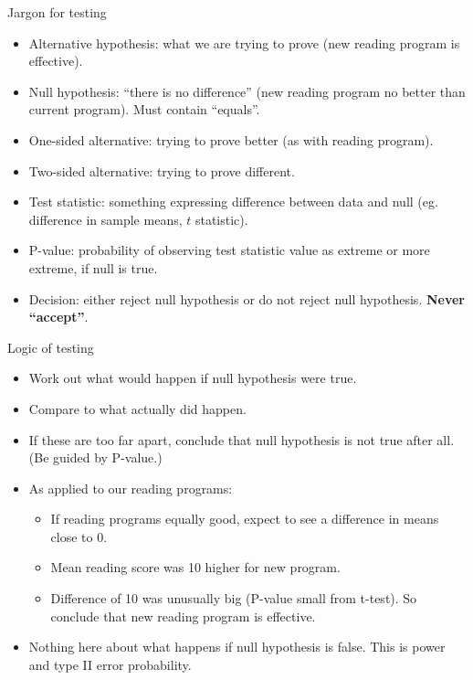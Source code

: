 \documentclass[
  ignorenonframetext,
]{beamer}
\providecommand{\tightlist}{%
  \setlength{\itemsep}{0pt}\setlength{\parskip}{0pt}}
\begin{document}
\begin{frame}{Jargon for testing}
\protect\hypertarget{jargon-for-testing}{}

\begin{itemize}
\tightlist
\item
  Alternative hypothesis: what we are trying to prove (new reading
  program is effective).
\item
  Null hypothesis: ``there is no difference'' (new reading program no
  better than current program). Must contain ``equals''.
\item
  One-sided alternative: trying to prove better (as with reading
  program).
\item
  Two-sided alternative: trying to prove different.
\item
  Test statistic: something expressing difference between data and null
  (eg. difference in sample means, \(t\) statistic).
\item
  P-value: probability of observing test statistic value as extreme or
  more extreme, if null is true.
\item
  Decision: either reject null hypothesis or do not reject null
  hypothesis. \textbf{Never ``accept''}.
\end{itemize}

\end{frame}

\begin{frame}{Logic of testing}
\protect\hypertarget{logic-of-testing}{}

\begin{itemize}
\tightlist
\item
  Work out what would happen if null hypothesis were true.
\item
  Compare to what actually did happen.
\item
  If these are too far apart, conclude that null hypothesis is not true
  after all. (Be guided by P-value.)
\item
  As applied to our reading programs:

  \begin{itemize}
  \tightlist
  \item
    If reading programs equally good, expect to see a difference in
    means close to 0.
  \item
    Mean reading score was 10 higher for new program.
  \item
    Difference of 10 was unusually big (P-value small from t-test). So
    conclude that new reading program is effective.
  \end{itemize}
\item
  Nothing here about what happens if null hypothesis is false. This is
  power and type II error probability.
\end{itemize}

\end{frame}
\end{document}
